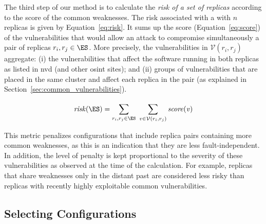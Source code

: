 
The third step of our method is to calculate the \emph{risk of a set of replicas} according to the score of the common weaknesses.
The risk associated with a \ES with $n$ replicas is given by Equation~\ref{eq:risk}. 
It sums up the score (Equation~\ref{eq:score}) of the vulnerabilities that would allow an attack to compromise simultaneously a pair of replicas $r_i,r_j \in \ES$.
More precisely, the vulnerabilities in $\mathcal{V}(r_i,r_j)$ aggregate: (i) the vulnerabilities that affect the software running in both replicas as listed in \gls{nvd} (and other \gls{osint} sites); and (ii) groups of vulnerabilities that are placed in the same cluster and affect each replica in the pair (as explained in Section~\ref{sec:common_vulnerabilities}). 

\begin{equation}
\mathit{risk(\ES)}=\sum_{r_i,r_j \in \ES}^{} \hspace{1.2mm} \sum_{v \in \mathcal{V}(r_i,r_j)}^{}\mathit{score(v)}
\label{eq:risk}
\end{equation} 

This metric penalizes configurations that include replica pairs containing more common weaknesses, as this is an indication that they are less fault-independent.
In addition, the level of penalty is kept proportional to the severity of these vulnerabilities as observed at the time of the calculation. 
For example, replicas that share weaknesses only in the distant past are considered less risky than replicas with recently highly exploitable common vulnerabilities.


\subsection{Selecting Configurations}
\label{sec:configurations}

